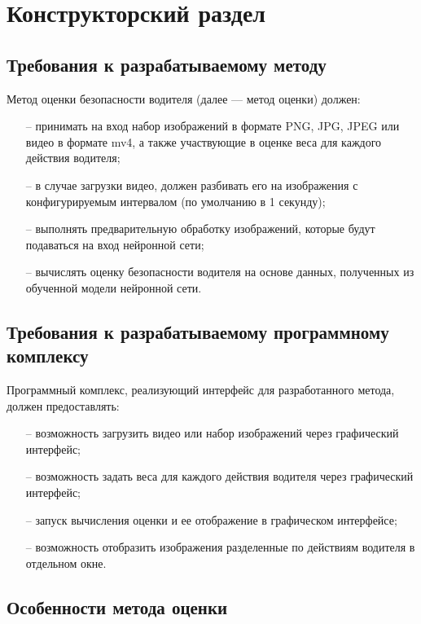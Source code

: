 \section{Конструкторский раздел}

\subsection{Требования к разрабатываемому методу}

Метод оценки безопасности водителя (далее — метод оценки) должен:
\begin{itemize}[leftmargin=1.6\parindent]
	\item[--] принимать на вход набор изображений в формате PNG, JPG, JPEG или видео в формате mv4, а также участвующие в оценке веса для каждого действия водителя;
	\item[--] в случае загрузки видео,  должен разбивать его на изображения с конфигурируемым интервалом (по умолчанию в 1 секунду);
	\item[--] выполнять предварительную обработку изображений, которые будут подаваться на вход нейронной сети;
	\item[--] вычислять оценку безопасности водителя на основе данных, полученных из обученной модели нейронной сети.
\end{itemize}

\subsection{Требования к разрабатываемому программному комплексу}
Программный комплекс, реализующий интерфейс для разработанного
метода, должен предоставлять:

\begin{itemize}[leftmargin=1.6\parindent]
	\item[--] возможность загрузить видео или набор изображений через графический интерфейс;
	\item[--] возможность задать веса для каждого действия водителя через графический интерфейс;
	\item[--] запуск вычисления оценки и ее отображение в графическом интерфейсе;
	\item[--] возможность отобразить изображения разделенные по действиям водителя в отдельном окне.
\end{itemize}

\subsection{Особенности метода оценки}
